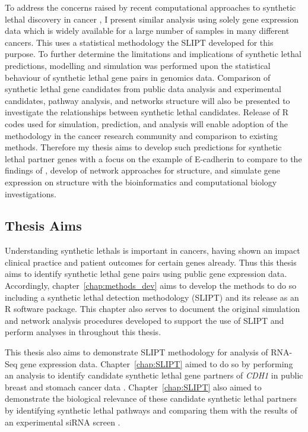 To address the concerns raised by recent computational approaches to \gls{synthetic lethal} discovery in cancer \citep{Jerby2014, Lu2015, Wappett2016}, I present similar analysis using solely \gls{gene expression} data which is widely available for a large number of samples in many different cancers. This uses a statistical methodology the \gls{SLIPT} developed for this purpose. To further determine the limitations and implications of \gls{synthetic lethal} predictions, modelling and simulation was performed upon the statistical behaviour of \gls{synthetic lethal} gene pairs in \glspl{genomic} data. Comparison of \gls{synthetic lethal} gene candidates from public data analysis and experimental candidates, pathway analysis, and networks structure will also be presented to investigate the relationships between \gls{synthetic lethal} candidates. Release of R codes used for simulation, prediction, and analysis will enable adoption of the methodology in the cancer research community and comparison to existing methods. Therefore my thesis aims to develop such predictions for \gls{synthetic lethal} partner genes with a focus on the example of \gls{E-cadherin} to compare to the findings of \citet{Telford2015}, develop of network approaches for  structure, and simulate \gls{gene expression} on  structure with the \gls{bioinformatics} and \gls{computational biology} investigations.

\subsection{Thesis Aims}

Understanding \glspl{synthetic lethal} is important in cancers, having shown an impact clinical practice and patient outcomes for certain genes already. Thus this thesis aims to identify \gls{synthetic lethal} gene pairs using public \gls{gene expression} data. Accordingly, chapter~\ref{chap:methods_dev} aims to develop the methods to do so including a \gls{synthetic lethal} detection methodology (\gls{SLIPT}) and its release as an R software package. This chapter also serves to document the original simulation and network analysis procedures developed to support the use of \gls{SLIPT} and perform analyses in throughout this thesis. 

This thesis also aims to demonstrate \gls{SLIPT} methodology for analysis of \gls{RNA-Seq} \gls{gene expression} data. Chapter~\ref{chap:SLIPT} aimed to do so by performing an analysis to identify candidate \gls{synthetic lethal} gene partners of \textit{CDH1} in public breast and stomach cancer data \citep{TCGA2012, TCGA2014GC}. Chapter~\ref{chap:SLIPT} also aimed to demonstrate the biological relevance of these candidate \gls{synthetic lethal} partners by identifying \gls{synthetic lethal} pathways and comparing them with the results of an experimental \gls{siRNA} screen \citep{Telford2015}.

